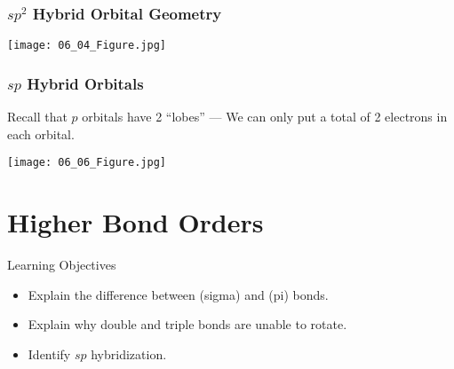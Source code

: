 \documentclass[notes=only]{beamer}
\begin{document}
\begin{frame}\frametitle{$sp^2$ Hybrid Orbital Geometry}
	\begin{center}
		\texttt{[image: 06\_04\_Figure.jpg]}
	\end{center}
\end{frame}

\begin{frame}
	\frametitle{$sp$ Hybrid Orbitals}

	Recall that $p$ orbitals have 2 ``lobes'' --- We can \alert{only} put a total of 2 electrons in each
	\alert{orbital}.

	\bigskip

	\begin{center}
		\texttt{[image: 06\_06\_Figure.jpg]}
	\end{center}
\end{frame}


\section{Higher Bond Orders}

\begin{frame}{Learning Objectives}
	\begin{itemize}
		\item Explain the difference between \textsigma{} (sigma) and
			\textpi{} (pi) bonds.
		\item Explain why double and triple bonds are unable to rotate.
		\item Identify $sp$ hybridization.
	\end{itemize}
\end{frame}
\end{document}
